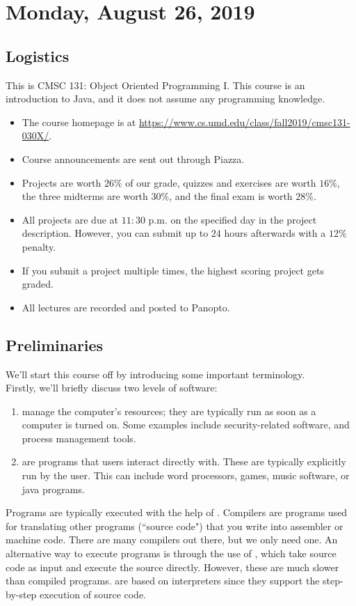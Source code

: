 \section{Monday, August 26, 2019}

\subsection{Logistics}

This is CMSC 131: Object Oriented Programming I. This course is an introduction to Java, and it does not assume any programming knowledge. 

\begin{itemize}
    \item The course homepage is at \url{https://www.cs.umd.edu/class/fall2019/cmsc131-030X/}.
    \item Course announcements are sent out through Piazza.
    \item Projects are worth $26\%$ of our grade, quizzes and exercises are worth $16\%$, the three midterms are worth $30\%$, and the final exam is worth $28\%$.
    \item All projects are due at $11:30$ p.m. on the specified day in the project description. However, you can submit up to $24$ hours afterwards with a $12\%$ penalty.
    \item If you submit a project multiple times, the highest scoring project gets graded.
    \item All lectures are recorded and posted to Panopto.
\end{itemize}


\subsection{Preliminaries}

We'll start this course off by introducing some important terminology. \\

Firstly, we'll briefly discuss two levels of software:  
\begin{enumerate}
    \item {} manage the computer's resources; they are typically run as soon as a computer is turned on. Some examples include security-related software, and process management tools.
    \item {} are programs that users interact directly with. These are typically explicitly run by the user. This can include word processors, games, music software, or java programs.
\end{enumerate}


Programs are typically executed with the help of . Compilers are programs used for translating other programs (``source code") that you write into assembler or machine code. There are many compilers out there, but we only need one. An alternative way to execute programs is through the use of , which take source code as input and execute the source directly. However, these are much slower than compiled programs.  are based on interpreters since they support the step-by-step execution of source code.